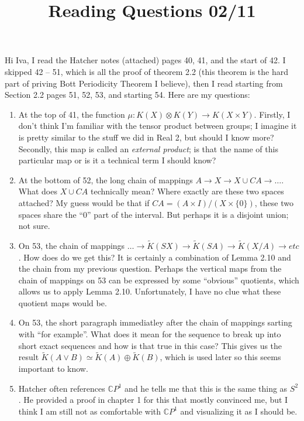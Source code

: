 \documentclass[12]{amsart}
\begin{document}
\title{Reading Questions 02/11}
\maketitle

Hi Iva, I read the Hatcher notes (attached) pages 40, 41, and the start of 42. I skipped 42 -- 51, which is all the proof of theorem 2.2 (this theorem is the hard part of priving Bott Periodicity Theorem I believe), then I read starting from Section 2.2 pages 51, 52, 53, and starting 54. Here are my questions:\\

\begin{enumerate}
    \item At the top of 41, the function $\mu: K(X) \otimes K(Y) \to K(X \times Y)$. Firstly, I don't think I'm familiar with the tensor product between groups; I imagine it is pretty similar to the stuff we did in Real 2, but should I know more? Secondly, this map is called an \emph{external product}; is that the name of this particular map or is it a technical term I should know?\\

    \item At the bottom of 52, the long chain of mappings $A \to X \to X \cup CA \to \dots$. What does $X \cup CA$ technically mean? Where exactly are these two spaces attached? My guess would be that if $CA = (A \times I)/(X \times \{0\})$, these two spaces share the ``$0$'' part of the interval. But perhaps it is a disjoint union; not sure.\\

    \item On 53, the chain of mappings $\dots \to \tilde{K}(SX) \to \tilde{K}(SA) \to \tilde{K}(X/A) \to etc$. How does do we get this? It is certainly a combination of Lemma 2.10 and the chain from my previous question. Perhaps the vertical maps from the chain of mappings on 53 can be expressed by some ``obvious'' quotients, which allows us to apply Lemma 2.10. Unfortunately, I have no clue what these quotient maps would be.\\

    \item On 53, the short paragraph immediatley after the chain of mappings sarting with ``for example''. What does it mean for the sequence to break up into short exact sequences and how is that true in this case? This gives us the result $\tilde{K}(A \lor B) \simeq \tilde{K}(A) \oplus \tilde{K}(B)$, which is used later so this seems important to know.\\

    \item Hatcher often references $\mathbb{C}P^1$ and he tells me that this is the same thing as $S^2$. He provided a proof in chapter 1 for this that mostly convinced me, but I think I am still not as comfortable with $\mathbb{C}P^1$ and visualizing it as I should be.\\

\end{enumerate}
\end{document}
